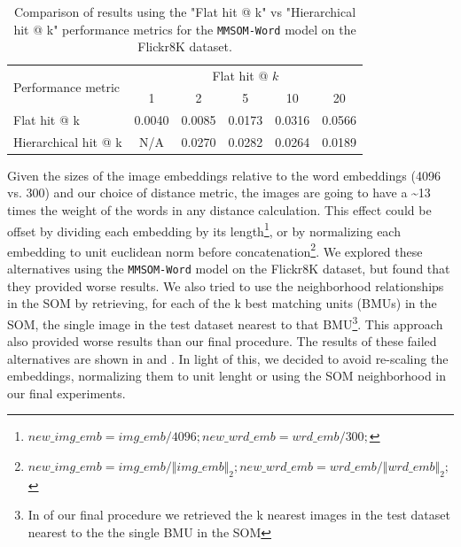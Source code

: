 \documentclass[a4paper]{standalone}
\begin{document}
\begin{table}[h]
    \begin{footnotesize}
        \begin{tabularx}{\textwidth}{|X|c|c|c|c|c|}
            \hline
            \multirow{2}{*}{Performance metric} & \multicolumn{5}{c|}{Flat hit @ $k$} \\
            \cline{2-5}                         & 1      & 2      & 5      & 10     & 20       \\ 
            \hline
            Flat hit @ k                        & 0.0040 & 0.0085 & 0.0173 & 0.0316 & 0.0566   \\ 
            \hline
            Hierarchical hit @ k                & N/A    & 0.0270 & 0.0282 & 0.0264 & 0.0189   \\ 
            \hline
        \end{tabularx}
    \end{footnotesize}
    \caption{Comparison of results using the "Flat hit @ k" vs "Hierarchical hit @ k" performance metrics for the \texttt{MMSOM-Word} model on the Flickr8K dataset.}
    \label{tab:ImageRetrievalHierarchical}
\end{table}

Given the sizes of the image embeddings relative to the word embeddings (4096 vs. 300) and our choice of distance metric, the images are going to have a \textasciitilde 13 times the weight of the words in any distance calculation. This effect could be offset by dividing each embedding by its length\footnote{$new\_img\_emb = img\_emb/4096; new\_wrd\_emb = wrd\_emb/300; $}, or by normalizing each embedding to unit euclidean norm before concatenation\footnote{$new\_img\_emb = img\_emb/\Vert img\_emb \Vert_2; new\_wrd\_emb = wrd\_emb/\Vert wrd\_emb \Vert_2; $}. We explored these alternatives using the \verb|MMSOM-Word| model on the Flickr8K dataset, but found that they provided worse results. We also tried to use the neighborhood relationships in the SOM by retrieving, for each of the k best matching units (BMUs) in the SOM, the single image in the test dataset nearest to that BMU\footnote{In of our final procedure we retrieved the k nearest images in the test dataset nearest to the the single BMU in the SOM}. This approach also provided worse results than our final procedure. The results of these failed alternatives are shown in  and . In light of this, we decided to avoid re-scaling the embeddings, normalizing them to unit lenght or using the SOM neighborhood in our final experiments.
\end{document}
